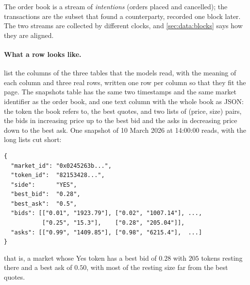 The order book is a stream of \emph{intentions} (orders placed and cancelled); the
transactions are the subset that found a counterparty, recorded one block later.  The two
streams are collected by different clocks, and \cref{sec:data:blocks} says how they are
aligned.

\paragraph{What a row looks like.}  
list the columns of the three tables that the models read, with the meaning of each column
and three real rows, written one row per column so that they fit the page.  The snapshots table has the same two timestamps and the same market
identifier as the order book, and one text column with the whole book as JSON: the token
the book refers to, the best quotes, and two lists of (price, size) pairs, the bids in
increasing price up to the best bid and the asks in decreasing price down to the best ask.
One snapshot of 10 March 2026 at 14:00:00 reads, with the long lists cut short:
\par\noindent\begin{minipage}{\linewidth}
\begin{lstlisting}[style=json]
{
  "market_id": "0x0245263b...",
  "token_id":  "82153428...",
  "side":      "YES",
  "best_bid":  "0.28",
  "best_ask":  "0.5",
  "bids": [["0.01", "1923.79"], ["0.02", "1007.14"], ...,
           ["0.25", "15.3"],    ["0.28", "205.04"]],
  "asks": [["0.99", "1409.85"], ["0.98", "6215.4"],  ...]
}
\end{lstlisting}
\end{minipage}\par\noindent
that is, a market whose Yes token has a best bid of $0.28$ with $205$ tokens resting there
and a best ask of $0.50$, with most of the resting size far from the best quotes.

